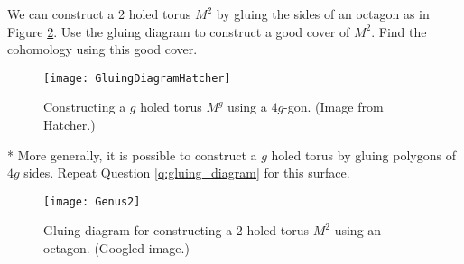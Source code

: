 %
%
%


\begin{ques}
  \label{q:gluing_diagram}
  We can construct a 2 holed torus $M^2$ by gluing the sides of an octagon as in Figure \ref{fig:genus2}. Use the gluing diagram to construct a good cover of $M^2$. Find the cohomology using this good cover.
\end{ques}

\begin{figure}[h]
	\centering
	\texttt{[image: GluingDiagramHatcher]}
	\caption{Constructing a $g$ holed torus $M^g$ using a $4g$-gon. (Image from Hatcher.)}
  \label{fig:genus2}
\end{figure}
\begin{ques}*
  More generally, it is possible to construct a $g$ holed torus by gluing polygons of $4g$ sides. Repeat Question \ref{q:gluing_diagram} for this surface.
\end{ques}


\begin{figure}[H]
	\centering
	\texttt{[image: Genus2]}
	\caption{Gluing diagram for constructing a 2 holed torus $M^2$ using an octagon. (Googled image.)}
  \label{fig:genus2}
\end{figure}

